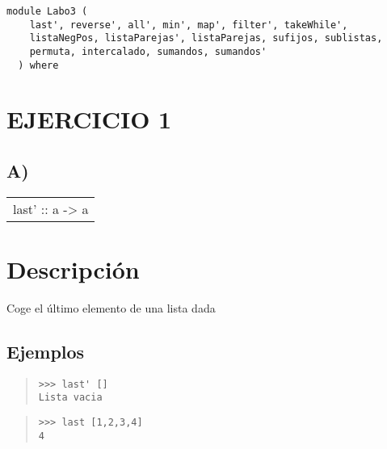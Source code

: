 \label{module:Labo3}
\haddockbeginheader
{\haddockverb\begin{verbatim}
module Labo3 (
    last', reverse', all', min', map', filter', takeWhile',
    listaNegPos, listaParejas', listaParejas, sufijos, sublistas,
    permuta, intercalado, sumandos, sumandos'
  ) where\end{verbatim}}
\haddockendheader

\section{EJERCICIO 1}
\subsection{A)}
\begin{haddockdesc}
\item[\begin{tabular}{@{}l}
last' :: {\char 91}a{\char 93} -> a
\end{tabular}]
{\haddockbegindoc
\section*{Descripción}
Coge el último elemento de una lista dada\par
\subsection*{Ejemplos}
\begin{quote}
{\haddockverb\begin{verbatim}
>>> last' []
Lista vacia

\end{verbatim}}
\end{quote}
\begin{quote}
{\haddockverb\begin{verbatim}
>>> last [1,2,3,4]
4

\end{verbatim}}
\end{quote}}
\end{haddockdesc}
